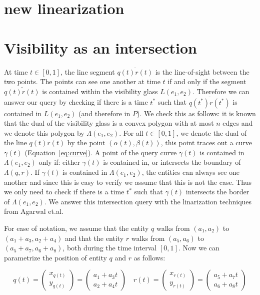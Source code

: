\documentclass{article}
\newcommand{\etal}{et.al\xspace}
\begin{document}
\section{new linearization}




\section{Visibility as an intersection}


At time $t \in [0,1]$, the line segment $\overline{q(t)r(t)}$ is the line-of-sight between the two points. The points can see one another at time $t$ if and only if the segment $\overline{q(t)r(t)}$  is contained within the visibility glass $L(e_1, e_2)$. Therefore we can answer our query by checking if there is a time $t^*$ such that $\overline{q(t^*)r(t^*)}$ is contained in $L(e_1,e_2)$ (and therefore in $P$). We check this as follows:
it is known \cite{Chazelle1989} that the dual of the visibility glass is a
convex polygon with at most $n$ edges and we denote this polygon by
$\Lambda(e_1,e_2)$. For all $t \in [0,1]$, we denote the dual of the line
$q(t)r(t)$ by the point $(\alpha(t), \beta(t))$, this point traces out a curve
$\gamma(t)$ (Equation~\ref{eq:curve}). A point of the query curve $\gamma(t)$
is contained in $\Lambda(e_1,e_2)$ only if: either $\gamma(t)$ is contained in,
or intersects the boundary of $\Lambda(q,r)$.
If $\gamma(t)$ is contained in $\Lambda(e_1, e_2)$, the entities can always see one another and since this is easy to verify we assume that this is not the case. Thus we only need to check if there is a time $t^*$ such that $\gamma(t)$ intersects the border of $\Lambda(e_1, e_2)$. We answer this intersection query with the linarization techniques from Agarwal \etal \cite{agarwal2013range}. 


For ease of notation, we assume that the entity $q$ walks from $(a_1, a_2)$ to $(a_1 + a_3, a_2 + a_4)$ and that the entity $r$ walks from $(a_5, a_6)$ to $(a_5 + a_7, a_6 + a_8)$, 
both during the time interval $[0,1]$. Now we can parametrize the position of entity $q$ and $r$ as follows:

\begin{equation}
    \label{eq:line}
     q(t) = \left( \begin{array}{c}
         x_{q(t)}  \\
         y_{q(t)} 
    \end{array}  \right) = 
    \left( \begin{array}{c}
         a_1 + a_3 t \\
         a_2 + a_4 t
    \end{array}  \right)  \quad
      r(t) = \left( \begin{array}{c}
         x_{r(t)}  \\
         y_{r(t)} 
    \end{array}  \right) = 
    \left( \begin{array}{c}
         a_5 + a_7 t \\
         a_6 + a_8 t
    \end{array}  \right) 
\end{equation}
\end{document}
